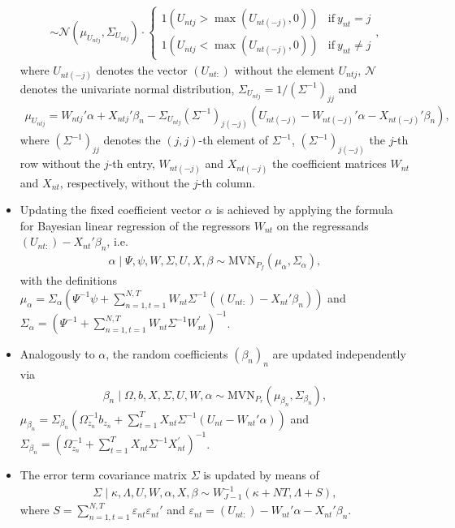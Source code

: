 \documentclass[article]{jss}
\begin{document}
\begin{itemize}
\begin{align*}
  \sim \mathcal{N}(\mu_{U_{ntj}},\Sigma_{U_{ntj}}) \cdot \begin{cases}
  1(U_{ntj}>\max(U_{nt(-j)},0) ) & \text{if}~ y_{nt}=j\\
  1(U_{ntj}<\max(U_{nt(-j)},0) ) & \text{if}~ y_{nt}\neq j
  \end{cases},
  \end{align*}
  where $U_{nt(-j)}$ denotes the vector $(U_{nt:})$ without the element $U_{ntj}$, $\mathcal{N}$ denotes the univariate normal distribution, $\Sigma_{U_{ntj}} = 1/(\Sigma^{-1})_{jj}$ and
  \begin{align*}
  \mu_{U_{ntj}} = W_{ntj}'\alpha + X_{ntj}'\beta_n - \Sigma_{U_{ntj}} (\Sigma^{-1})_{j(-j)}   (U_{nt(-j)} - W_{nt(-j)}'\alpha - X_{nt(-j)}' \beta_n ),
  \end{align*}
  where $(\Sigma^{-1})_{jj}$ denotes the $(j,j)$-th element of $\Sigma^{-1}$, $(\Sigma^{-1})_{j(-j)}$ the $j$-th row without the $j$-th entry, $W_{nt(-j)}$ and $X_{nt(-j)}$ the coefficient matrices $W_{nt}$ and $X_{nt}$, respectively, without the $j$-th column.
  \item Updating the fixed coefficient vector $\alpha$ is achieved by applying the formula for Bayesian linear regression of the regressors $W_{nt}$ on the regressands $(U_{nt:})-X_{nt}'\beta_n$, i.e.
  \begin{align*}
  \alpha \mid \Psi,\psi,W,\Sigma,U,X,\beta \sim \text{MVN}_{P_f}(\mu_\alpha,\Sigma_\alpha),
  \end{align*}
  with the definitions $\mu_\alpha = \Sigma_\alpha (\Psi^{-1}\psi + \sum_{n=1,t=1}^{N,T} W_{nt} \Sigma^{-1} ((U_{nt:})-X_{nt}'\beta_n) )$ and $\Sigma_\alpha = (\Psi^{-1} + \sum_{n=1,t=1}^{N,T} W_{nt}\Sigma^{-1} W_{nt}^{'} )^{-1}$.
  \item Analogously to $\alpha$, the random coefficients $(\beta_n)_n$ are updated independently via
  \begin{align*}
  \beta_n \mid \Omega,b,X,\Sigma,U,W,\alpha \sim \text{MVN}_{P_r}(\mu_{\beta_n},\Sigma_{\beta_n}),
  \end{align*}
  $\mu_{\beta_n} = \Sigma_{\beta_n} (\Omega_{z_n}^{-1}b_{z_n} + \sum_{t=1}^{T} X_{nt} \Sigma^{-1} (U_{nt}-W_{nt}'\alpha) )$ and $\Sigma_{\beta_n} = (\Omega_{z_n}^{-1} + \sum_{t=1}^{T} X_{nt}\Sigma^{-1} X_{nt}^{'} )^{-1}$.
    \item The error term covariance matrix $\Sigma$ is updated by means of
  \begin{align*}
  \Sigma \mid \kappa,\Lambda,U,W,\alpha,X,\beta \sim W^{-1}_{J-1}(\kappa+NT,\Lambda+S),
  \end{align*}
  where $S = \sum_{n=1,t=1}^{N,T} \varepsilon_{nt} \varepsilon_{nt}'$ and $\varepsilon_{nt} = (U_{nt:}) - W_{nt}'\alpha - X_{nt}'\beta_n$.
\end{itemize}
\end{document}
